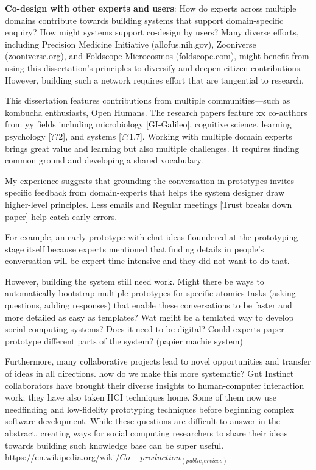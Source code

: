 \textbf{Co-design with other experts and users}: How do experts across multiple domains contribute towards building systems that support domain-specific enquiry? How might systems support co-design by users?
Many diverse efforts, including Precision Medicine Initiative (allofus.nih.gov), Zooniverse (zooniverse.org), and Foldscope Microcosmos (foldscope.com), might benefit from using this dissertation’s principles to diversify and deepen citizen contributions. However, building such a network requires effort that are tangential to research. 

This dissertation features contributions from multiple communities—such as kombucha enthusiasts, Open Humans. The research papers feature xx co-authors from yy fields including microbiology [GI-Galileo], cognitive science, learning psychology [??2], and systems [??1,7]. Working with multiple domain experts brings great value and learning but also multiple challenges. It requires finding common ground and developing a shared vocabulary. 

My experience suggests that grounding the conversation in prototypes invites specific feedback from domain-experts that helps the system designer draw higher-level principles. Less emails and Regular meetings [Trust breaks down paper] help catch early errors.

For example, an early prototype with chat ideas floundered at the prototyping stage itself because experts mentioned that finding details in people's conversation will be expert time-intensive and they did not want to do that. 

However, building the system still need work. Might there be ways to automatically bootstrap multiple prototypes for specific atomics tasks (asking questions, adding responses) that enable these conversations to be faster and more detailed as easy as templates? Wat mgiht be a temlated way to develop social computing systems? Does it need to be digital? Could experts paper prototype different parts of the system? (papier machie system)

Furthermore, many collaborative projects lead to novel opportunities and transfer of ideas in all directions. how do we make this more systematic? Gut Instinct collaborators have brought their diverse insights to human-computer interaction work; they have also taken HCI techniques home. Some of them now use needfinding and low-fidelity prototyping techniques before beginning complex software development. While these questions are difficult to answer in the abstract, creating ways for social computing researchers to share their ideas towards building such knowledge base can be super useful.    https://en.wikipedia.org/wiki/$Co-production_(public_services)$



